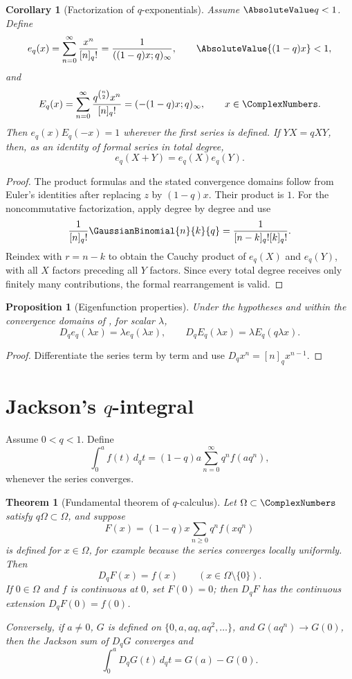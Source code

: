 \documentclass[11pt,a4paper,oneside,openany]{book}
\newtheorem{theorem}{Theorem}[chapter]
\newtheorem{proposition}[proposition]{Proposition}
\newtheorem{corollary}[corollary]{Corollary}
\theoremstyle{definition}
\theoremstyle{remark}
\begin{document}
\begin{corollary}[Factorization of $q$-exponentials]\label{cor:qexp-factor}
Assume $\AbsoluteValue q<1$.  Define
\[
 e_q(x)=\sum_{n=0}^{\infty}\frac{x^n}{[n]_q!}
 =\frac1{((1-q)x;q)_\infty},
 \qquad \AbsoluteValue{(1-q)x}<1,
\]
and
\[
 E_q(x)=\sum_{n=0}^{\infty}\frac{q^{\binom n2}x^n}{[n]_q!}
 =(-(1-q)x;q)_\infty,
 \qquad x\in\ComplexNumbers.
\]
Then $e_q(x)E_q(-x)=1$ wherever the first series is defined.  If $YX=qXY$, then, as an identity of formal series in total degree,
\[
 e_q(X+Y)=e_q(X)e_q(Y).
\]
\end{corollary}

\begin{proof}
The product formulas and the stated convergence domains follow from Euler's identities after replacing $z$ by $(1-q)x$.  Their product is $1$.  For the noncommutative factorization, apply  degree by degree and use
\[
 \frac1{[n]_q!}\GaussianBinomial{n}{k}{q}
 =\frac1{[n-k]_q![k]_q!}.
\]
Reindex with $r=n-k$ to obtain the Cauchy product of $e_q(X)$ and $e_q(Y)$, with all $X$ factors preceding all $Y$ factors.  Since every total degree receives only finitely many contributions, the formal rearrangement is valid.
\end{proof}

\begin{proposition}[Eigenfunction properties]\label{prop:qexp-eigen}
Under the hypotheses and within the convergence domains of , for scalar $\lambda$,
\[
 D_qe_q(\lambda x)=\lambda e_q(\lambda x),
 \qquad
 D_qE_q(\lambda x)=\lambda E_q(q\lambda x).
\]
\end{proposition}

\begin{proof}
Differentiate the series term by term and use $D_qx^n=[n]_qx^{n-1}$.
\end{proof}

\section{Jackson's \texorpdfstring{$q$}{q}-integral}

Assume $0<q<1$.  Define
\[
 \int_0^a f(t)\,d_qt
 =(1-q)a\sum_{n=0}^{\infty}q^nf(aq^n),
\]
whenever the series converges.

\begin{theorem}[Fundamental theorem of $q$-calculus]\label{thm:q-fundamental}
Let $\Omega\subset\ComplexNumbers$ satisfy $q\Omega\subset\Omega$, and
suppose
\[
 F(x)=(1-q)x\sum_{n\ge0}q^nf(xq^n)
\]
is defined for $x\in\Omega$, for example because the series converges locally
uniformly.  Then
\[
 D_qF(x)=f(x)\qquad(x\in\Omega\setminus\{0\}).
\]
If $0\in\Omega$ and $f$ is continuous at $0$, set $F(0)=0$; then $D_qF$
has the continuous extension $D_qF(0)=f(0)$.

Conversely, if $a\ne0$, $G$ is defined on
$\{0,a,aq,aq^2,\ldots\}$, and $G(aq^n)\to G(0)$, then the Jackson sum of
$D_qG$ converges and
\[
 \int_0^aD_qG(t)\,d_qt=G(a)-G(0).
\]
\end{theorem}
\end{document}
